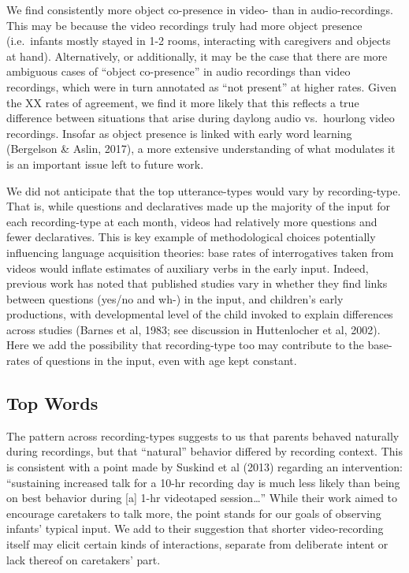 \documentclass[floatsintext,man]{apa6}
\theoremstyle{definition}
\theoremstyle{definition}
\theoremstyle{definition}
\theoremstyle{remark}
\begin{document}
We find consistently more object co-presence in video- than in
audio-recordings. This may be because the video recordings truly had
more object presence (i.e.~infants mostly stayed in 1-2 rooms,
interacting with caregivers and objects at hand). Alternatively, or
additionally, it may be the case that there are more ambiguous cases of
\enquote{object co-presence} in audio recordings than video recordings,
which were in turn annotated as \enquote{not present} at higher rates.
Given the XX rates of agreement, we find it more likely that this
reflects a true difference between situations that arise during daylong
audio vs.~hourlong video recordings. Insofar as object presence is
linked with early word learning (Bergelson \& Aslin, 2017), a more
extensive understanding of what modulates it is an important issue left
to future work.

We did not anticipate that the top utterance-types would vary by
recording-type. That is, while questions and declaratives made up the
majority of the input for each recording-type at each month, videos had
relatively more questions and fewer declaratives. This is key example of
methodological choices potentially influencing language acquisition
theories: base rates of interrogatives taken from videos would inflate
estimates of auxiliary verbs in the early input. Indeed, previous work
has noted that published studies vary in whether they find links between
questions (yes/no and wh-) in the input, and children's early
productions, with developmental level of the child invoked to explain
differences across studies (Barnes et al, 1983; see discussion in
Huttenlocher et al, 2002). Here we add the possibility that
recording-type too may contribute to the base-rates of questions in the
input, even with age kept constant.

\hypertarget{top-words}{%
\subsection{Top Words}\label{top-words}}

The pattern across recording-types suggests to us that parents behaved
naturally during recordings, but that \enquote{natural} behavior
differed by recording context. This is consistent with a point made by
Suskind et al (2013) regarding an intervention: \enquote{sustaining
increased talk for a 10-hr recording day is much less likely than being
on best behavior during {[}a{]} 1-hr videotaped session\ldots{}} While
their work aimed to encourage caretakers to talk more, the point stands
for our goals of observing infants' typical input. We add to their
suggestion that shorter video-recording itself may elicit certain kinds
of interactions, separate from deliberate intent or lack thereof on
caretakers' part.
\end{document}
